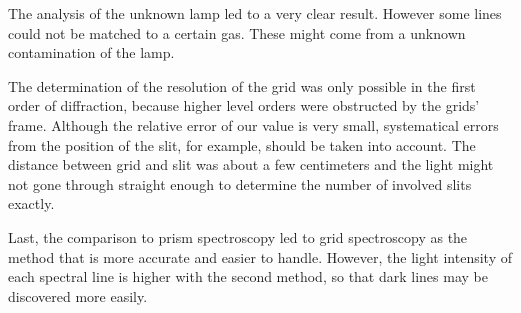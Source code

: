 \documentclass[a4paper,10pt]{article}
\begin{document}
The analysis of the unknown lamp led to a very clear result. However some lines could not be matched to a certain gas. These might come from a unknown contamination of the lamp.

The determination of the resolution of the grid was only possible in the first order of diffraction, because higher level orders were obstructed by the grids' frame. Although the relative error of our value is very small, systematical errors from the position of the slit, for example, should be taken into account. The distance between grid and slit was about a few centimeters and the light might not gone through straight enough to determine the number of involved slits exactly.

Last, the comparison to prism spectroscopy led to grid spectroscopy as the method that is more accurate and easier to handle. However, the light intensity of each spectral line is higher with the second method, so that dark lines may be discovered more easily.
\end{document}
